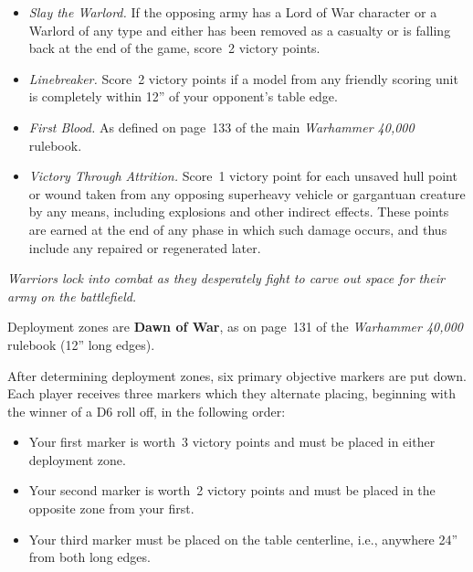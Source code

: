 \begin{itemize}
\item \textit{Slay the Warlord.}  If the opposing army has a Lord of
  War character or a Warlord of any type and either has been removed
  as a casualty or is falling back at the end of the game, score~2
  victory points.

\item \textit{Linebreaker.}  Score~2 victory points if a model from
  any friendly scoring unit is completely within 12'' of your
  opponent's table edge.

\item \textit{First Blood.}  As defined on page~133 of the main
  \emph{Warhammer 40,000} rulebook.

\item \textit{Victory Through Attrition.}  Score~1 victory point for
  each unsaved hull point or wound taken from any opposing superheavy
  vehicle or gargantuan creature by any means, including explosions
  and other indirect effects.  These points are earned at the end of
  any phase in which such damage occurs, and thus include any repaired
  or regenerated later.
\end{itemize}



\centerline{\emph{Warriors lock into combat as they desperately fight
    to carve out space for their army on the battlefield.}}


Deployment zones are \textbf{Dawn of War}, as on page~131 of the
\emph{Warhammer 40,000} rulebook (12'' long edges).

\bigskip%
After determining deployment zones, six primary objective markers are
put down.  Each player receives three markers which they alternate
placing, beginning with the winner of a D6 roll off, in the following
order:

\begin{itemize}
\item Your first marker is worth~3 victory points and must be placed
  in either deployment zone.

\item Your second marker is worth~2 victory points and must be placed
  in the opposite zone from your first.

\item Your third marker must be placed on the table centerline, i.e.,
  anywhere 24'' from both long edges.
\end{itemize}


